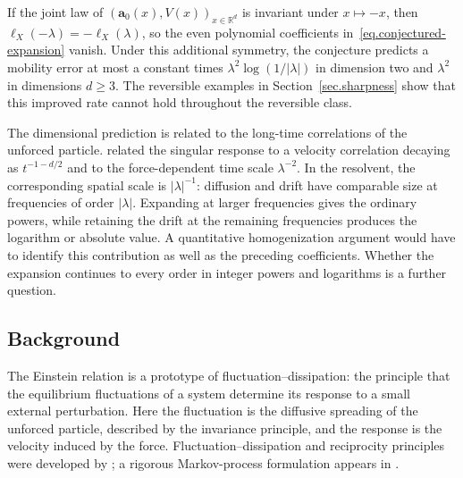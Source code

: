 \documentclass[11pt]{amsart}
\theoremstyle{definition}
\theoremstyle{remark}
\numberwithin{equation}{section}
\newcommand{\R}{\mathbb R}
\renewcommand{\a}{\mathbf a}
\begin{document}
If the joint law of $(\a_0(x),V(x))_{x\in\R^d}$ is invariant under $x\mapsto-x$, then $\ell_X(-\lambda)=-\ell_X(\lambda)$, so the even polynomial coefficients in~\eqref{eq.conjectured-expansion} vanish. Under this additional symmetry, the conjecture predicts a mobility error at most a constant times $\lambda^2\log(1/|\lambda|)$ in dimension two and $\lambda^2$ in dimensions $d\geq3$. The reversible examples in Section~\ref{sec.sharpness} show that this improved rate cannot hold throughout the reversible class.

The dimensional prediction is related to the long-time correlations of the unforced particle. \citet*{LeitmannBenichouFranosch2018} related the singular response to a velocity correlation decaying as $t^{-1-d/2}$ and to the force-dependent time scale $\lambda^{-2}$. In the resolvent, the corresponding spatial scale is $|\lambda|^{-1}$: diffusion and drift have comparable size at frequencies of order $|\lambda|$. Expanding at larger frequencies gives the ordinary powers, while retaining the drift at the remaining frequencies produces the logarithm or absolute value. A quantitative homogenization argument would have to identify this contribution as well as the preceding coefficients. Whether the expansion continues to every order in integer powers and logarithms is a further question.

\subsection{Background}\label{ss.background}

The Einstein relation is a prototype of fluctuation--dissipation: the principle that the equilibrium fluctuations of a system determine its response to a small external perturbation. Here the fluctuation is the diffusive spreading of the unforced particle, described by the invariance principle, and the response is the velocity induced by the force. Fluctuation--dissipation and reciprocity principles were developed by \citet{Nyquist1928,Onsager1931,Onsager1931II,CallenWelton1951}; a rigorous Markov-process formulation appears in \citet{DemboDeuschel2010}.
\end{document}
